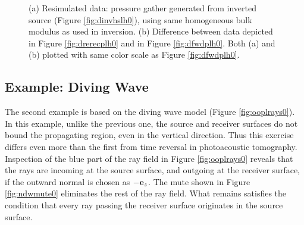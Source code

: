 \documentclass[georeport,12pt]{geophysics}
\begin{document}
\begin{figure}
  \centering
  \caption{(a) Resimulated data: pressure gather generated from
    inverted source (Figure \ref{fig:dinvhslh0}), using same
    homogeneous bulk modulus as used in inversion. (b) Difference
    between data depicted in Figure \ref{fig:drerecplh0} and in Figure \ref{fig:dfwdplh0}.
    Both (a) and (b) plotted with same color scale as Figure \ref{fig:dfwdplh0}.}
\end{figure}
  
\subsection{Example: Diving Wave}

The second example is based on the diving wave model (Figure
\ref{fig:ooplrays0}). In this example, unlike the previous one, the source
and receiver surfaces do not bound the propagating region, even in the
vertical direction. Thus this exercise differs even more than the
first from time reversal in photoacoustic tomography. Inspection of
the blue part of the ray field in Figure \ref{fig:ooplrays0} reveals that
the rays are incoming at the source surface, and outgoing at the receiver surface, if the
outward normal is chosen as $-{\bf e}_z$. The mute shown in Figure
\ref{fig:ndwmute0} eliminates the rest of the ray field. What remains
satisfies the condition that every ray passing the receiver surface
originates in the source surface.
\end{document}
